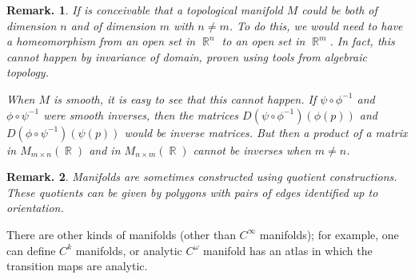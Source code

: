 \documentclass[11pt, a4paper]{memoir}
\DeclareMathOperator{\R}{{\mathbb{R}}}
\theoremstyle{change}
\theoremstyle{plain}
\theoremstyle{nonumberplain}
\newtheorem{remark}{Remark.}
\numberwithin{equation}{section}
\begin{document}
\begin{remark}
    If is conceivable that a topological manifold $M$ could be both of dimension $n$ and of dimension $m$ with $n\neq m$.
    To do this, we would need to have a homeomorphism from an open set in $\R^n$ to an open set in $\R^m$.
    In fact, this cannot happen by invariance of domain, proven using tools from algebraic topology.

    When $M$ is smooth, it is easy to see that this cannot happen.
    If $\psi\circ\phi^{-1}$ and $\phi\circ\psi^{-1}$ were smooth inverses, then the matrices $D(\psi\circ\phi^{-1})(\phi(p))$ and $D(\phi\circ\psi^{-1})(\psi(p))$ would be inverse matrices.
    But then a product of a matrix in $M_{m\times n}(\R)$ and in $M_{n\times m}(\R)$ cannot be inverses when $m\neq n$.
\end{remark}
\begin{remark}
    Manifolds are sometimes constructed using quotient constructions.
    These quotients can be given by polygons with pairs of edges identified up to orientation.
\end{remark}
There are other kinds of manifolds (other than $C^\infty$ manifolds); for example, one can define $C^k$ manifolds, or analytic $C^\omega$ manifold has an atlas in which the transition maps are analytic.
\end{document}
